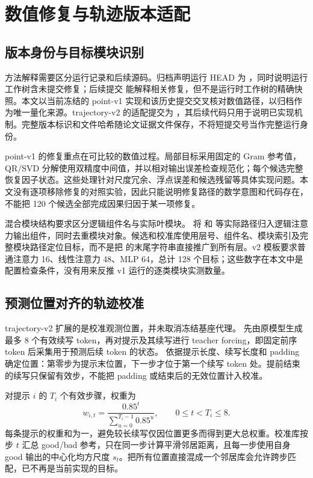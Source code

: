 \section{数值修复与轨迹版本适配}
\label{sec:adaptation}

\subsection{版本身份与目标模块识别}

方法解释需要区分运行记录和后续源码。归档声明运行 HEAD 为 ，同时说明运行工作树含未提交修复；后续提交  能解释相关修复，但不是运行时工作树的精确快照。本文以当前冻结的 point-v1 实现和该历史提交交叉核对数值路径，以归档作为唯一量化来源。trajectory-v2 的适配提交为 ，其后续代码只用于说明已实现机制。完整版本标识和文件哈希随论文证据文件保存，不将短提交号当作完整运行身份。

point-v1 的修复重点在可比较的数值过程。局部目标采用固定的 Gram 参考值，QR/SVD 分解使用双精度中间值，并以相对输出误差检查规范化；每个候选完整恢复因子状态。这些处理针对尺度冗余、浮点误差和候选残留等具体实现问题。本文没有逐项移除修复的对照实验，因此只能说明修复路径的数学意图和代码存在，不能把 120 个候选全部完成因果归因于某一项修复。

混合模块结构要求区分逻辑组件名与实际叶模块。 将  和  等实际路径归入逻辑注意力输出组件，同时去重模块对象。候选和校准库使用层号、组件名、模块索引及完整模块路径定位目标，而不是把  的末尾字符串直接推广到所有层。v2 模板要求普通注意力 16、线性注意力 48、MLP 64，总计 128 个目标；这些数字在本文中是配置检查条件，没有用来反推 v1 运行的逐类模块实测数量。

\subsection{预测位置对齐的轨迹校准}

trajectory-v2 扩展的是校准观测位置，并未取消冻结基座代理。 先由原模型生成最多 8 个有效续写 token，再对提示及其续写进行 teacher forcing，即固定前序 token 后采集用于预测后续 token 的状态。 依据提示长度、续写长度和 padding 确定位置：第零步为提示末位置，下一步才位于第一个续写 token 处。提前结束的续写只保留有效步，不能把 padding 或结束后的无效位置计入校准。

对提示 $i$ 的 $T_i$ 个有效步骤，权重为
\begin{equation}
 w_{i,t}=\frac{0.85^t}{\sum_{u=0}^{T_i-1}0.85^u},
 \qquad 0\leq t<T_i\leq8.
 \label{eq:trajectory-weight}
\end{equation}
每条提示的权重和为一，避免较长续写仅因位置更多而得到更大总权重。校准库按步 $t$ 汇总 good/bad 参考，只在同一步计算平滑邻居距离，且每一步使用自身 good 输出的中心化均方尺度 $s_t$。把所有位置直接混成一个邻居库会允许跨步匹配，已不再是当前实现的目标。

